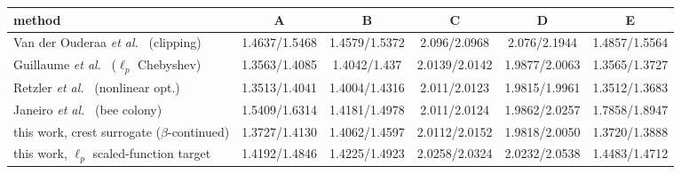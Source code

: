 \begin{tabular}{l c c c c c}
method & A & B & C & D & E \\
\hline
Van der Ouderaa \emph{et al.}~\cite{vanderouderaa1988peak} (clipping) & 1.4637/1.5468 & 1.4579/1.5372 & 2.096/2.0968 & 2.076/2.1944 & 1.4857/1.5564 \\
Guillaume \emph{et al.}~\cite{guillaume1991crest} ($\ell_p$ Chebyshev) & 1.3563/1.4085 & 1.4042/1.437 & 2.0139/2.0142 & 1.9877/2.0063 & 1.3565/1.3727 \\
Retzler \emph{et al.}~\cite{retzler2022crest} (nonlinear opt.) & 1.3513/1.4041 & 1.4004/1.4316 & 2.011/2.0123 & 1.9815/1.9961 & 1.3512/1.3683 \\
Janeiro \emph{et al.}~\cite{janeiro2020abc} (bee colony) & 1.5409/1.6314 & 1.4181/1.4978 & 2.011/2.0124 & 1.9862/2.0257 & 1.7858/1.8947 \\
\hline
this work, crest surrogate ($\beta$-continued) & 1.3727/1.4130 & 1.4062/1.4597 & 2.0112/2.0152 & 1.9818/2.0050 & 1.3720/1.3888 \\
this work, $\ell_p$ scaled-function target & 1.4192/1.4846 & 1.4225/1.4923 & 2.0258/2.0324 & 2.0232/2.0538 & 1.4483/1.4712 \\
\end{tabular}
